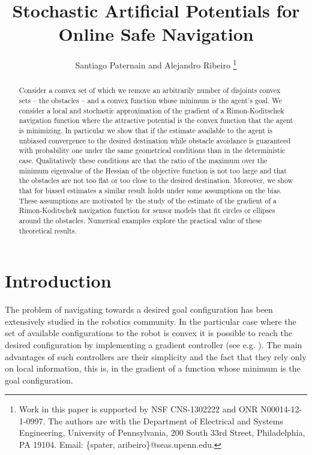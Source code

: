 \documentclass[article]{IEEEtran}
\title{Stochastic Artificial Potentials for Online Safe Navigation}
\author{Santiago Paternain and Alejandro Ribeiro
\thanks{Work in this paper is supported by NSF CNS-1302222 and ONR N00014-12-1-0997. The authors are with the Department of Electrical and Systems Engineering, University of Pennsylvania, 200 South 33rd Street, Philadelphia, PA 19104. Email: \{spater, aribeiro\}@seas.upenn.edu.}}
\theoremstyle{definition}
\begin{document}
\maketitle
\thispagestyle{empty}
\pagestyle{empty}



%
\begin{abstract}
%
  Consider a convex set of which we remove an arbitrarily number of disjoints convex sets -- the obstacles -- and a convex function whose minimum is the agent's goal. We consider a local and stochastic approximation of the gradient of a Rimon-Koditschek navigation function where the attractive potential is the convex function that the agent is minimizing. In particular we show that if the estimate available to the agent is unbiased convergence to the desired destination while obstacle avoidance is guaranteed with probability one under the same geometrical conditions than in the deterministic case. Qualitatively these conditions are that the ratio of the maximum over the minimum eigenvalue of the Hessian of the objective function is not too large and that the obstacles are not too flat or too close to the desired destination. Moreover, we show that for biased estimates a similar result holds under some assumptions on the bias. These assumptions are motivated by the study of the estimate of the gradient of a Rimon-Koditschek navigation function for sensor models that fit circles or ellipses around the obstacles. Numerical examples explore the practical value of these theoretical results.
\end{abstract}
%
%

\section{Introduction}
%
The problem of navigating towards a desired goal configuration has been extensively studied in the robotics community. In the particular case where the set of available configurations to the robot is convex it is possible to reach the desired configuration by implementing a gradient controller (see e.g. \cite{hirsch2004differential}). The main advantages of such controllers are their simplicity and the fact that they rely only on local information, this is, in the gradient of a function whose minimum is the goal configuration. 
\end{document}
